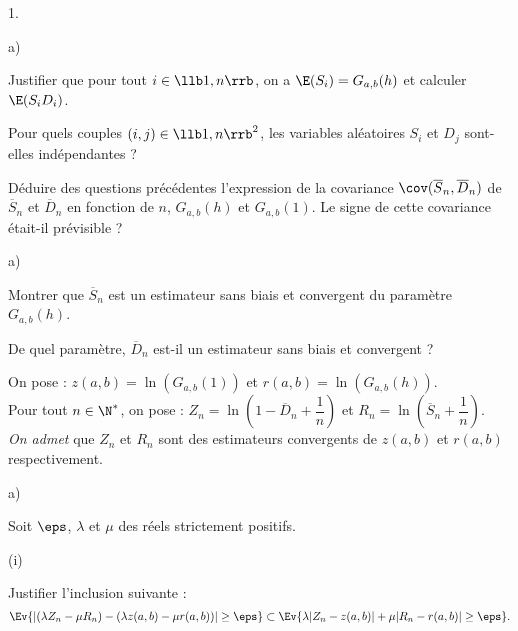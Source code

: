 \documentclass[11pt]{article}%
\begin{document}
\begin{noliste}{1.}
  \setcounter{enumi}{9}
\item 
  \begin{noliste}{a)}
    \setlength{\itemsep}{2mm}
  \item Justifier que pour tout $i\in\llb 1,n\rrb$, on a $\E(S_i) =
    G_{a,b}(h)$ et calculer $\E(S_iD_i)$.

    

  \item Pour quels couples $(i,j) \in \llb 1,n\rrb^2$, les variables
    aléatoires $S_i$ et $D_j$ sont-elles indépendantes ?

    

  \item Déduire des questions précédentes l'expression de la
    covariance $\cov(\overline{S}_n, \overline{D}_n)$ de
    $\overline{S}_n$ et $\overline{D}_n$ en fonction de $n$,
    $G_{a,b}(h)$ et $G_{a,b}(1)$. Le signe de cette covariance
    était-il prévisible ?

    
  \end{noliste}

\item
  \begin{noliste}{a)}
    \setlength{\itemsep}{2mm}
  \item Montrer que $\overline{S}_n$ est un estimateur sans biais et
    convergent du paramètre $G_{a,b}(h)$.

    

  \item De quel paramètre, $\overline{D}_n$ est-il un estimateur sans
    biais et convergent ?
    
    
  \end{noliste}
  

  
  
  
  


\item On pose : $z(a,b)=\ln(G_{a,b}(1))$ et $r(a,b)=\ln(G_{a,b}(h))$.\\
  Pour tout $n\in\N^*$, on pose : $Z_n = \ln\left(1-\overline{D}_n
    +\dfrac{1}{n}\right)$ et $R_n =
  \ln\left(\overline{S}_n+\dfrac{1}{n}\right)$.\\
  {\it On admet} que $Z_n$ et $R_n$ sont des estimateurs convergents
  de $z(a,b)$ et $r(a,b)$ respectivement.
  \begin{noliste}{a)}
    \setlength{\itemsep}{2mm}
  \item Soit $\eps$, $\lambda$ et $\mu$ des réels strictement
    positifs.
    \begin{noliste}{(i)}
    \item Justifier l'inclusion suivante :
      \[
      \Ev{ \left\vert (\lambda Z_n-\mu R_n) - (\lambda z(a,b) -\mu
          r(a,b))\right\vert \geq \eps} \subset \Ev{\lambda
        \vert Z_n - z(a,b)\vert + \mu \vert R_n-r(a,b)\vert \geq
        \eps}.
      \]
      

\end{noliste}
\end{noliste}
\end{noliste}
\end{document}
